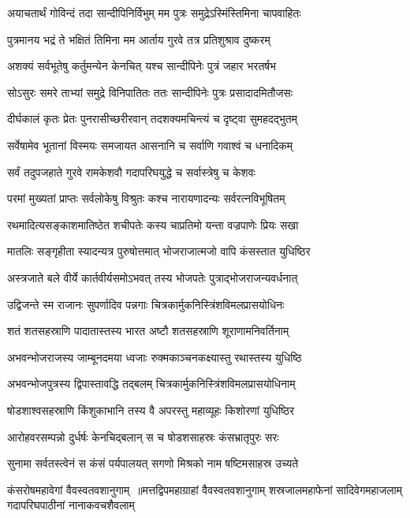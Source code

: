 \twolineshloka
{अयाचतार्थं गोविन्दं तदा सान्दीपिनिर्विभुम्}
{मम पुत्रः समुद्रेऽस्मिंस्तिमिना चापवाहितः}


\twolineshloka
{पुत्रमानय भद्रं ते भक्षितं तिमिना मम}
{आर्ताय गुरवे तत्र प्रतिशुश्राव दुष्करम्}


\twolineshloka
{अशक्यं सर्वभूतेषु कर्तुमन्येन केनचित्}
{यश्च सान्दीपिनेः पुत्रं जहार भरतर्षभ}


\twolineshloka
{सोऽसुरः समरे ताभ्यां समुद्रे विनिपातितः}
{ततः सान्दीपिनेः पुत्रः प्रसादादमितौजसः}


\twolineshloka
{दीर्घकालं कृतः प्रेतः पुनरासीच्छरीरवान्}
{तदशक्यमचिन्त्यं च दृष्ट्वा सुमहदद्भुतम्}


\twolineshloka
{सर्वेषामेव भूतानां विस्मयः समजायत}
{आसनानि च सर्वाणि गवाश्वं च धनादिकम्}


\twolineshloka
{सर्वं तदुपजहाते गुरवे रामकेशवौ}
{गदापरिघयुद्धे च सर्वास्त्रेषु च केशवः}


\twolineshloka
{परमां मुख्यतां प्राप्तः सर्वलोकेषु विश्रुतः}
{कश्च नारायणादन्यः सर्वरत्नविभूषितम्}


\twolineshloka
{रथमादित्यसङ्काशमातिष्ठेत शचीपतेः}
{कस्य चाप्रतिमो यन्ता वज्रपाणेः प्रियः सखा}


\twolineshloka
{मातलिः सङ्गृहीता स्यादन्यत्र पुरुषोत्तमात्}
{भोजराजात्मजो वापि कंसस्तात युधिष्ठिर}


\twolineshloka
{अस्त्रजाते बले वीर्ये कार्तवीर्यसमोऽभवत्}
{तस्य भोजपतेः पुत्राद्भोजराजन्यवर्धनात्}


\twolineshloka
{उद्विजन्ते स्म राजानः सुपर्णादिव पन्नगाः}
{चित्रकार्मुकनिस्त्रिंशविमलप्रासयोधिनः}


\twolineshloka
{शतं शतसहस्राणि पादातास्तस्य भारत}
{अष्टौ शतसहस्राणि शूराणामनिवर्तिनाम्}


\twolineshloka
{अभवन्भोजराजस्य जाम्बूनदमया ध्वजाः}
{रुक्मकाञ्चनकक्ष्यास्तु रथास्तस्य युधिष्ठि}


\twolineshloka
{अभवन्भोजपुत्रस्य द्विपास्तावद्धि तद्बलम्}
{चित्रकार्मुकनिस्त्रिंशविमलप्रासयोधिनाम्}


\twolineshloka
{षोडशाश्वसहस्राणि किंशुकाभानि तस्य वै}
{अपरस्तु महाव्यूहः किशोरणां युधिष्ठिर}


\twolineshloka
{आरोहवरसम्पन्नो दुर्धर्षः केनचिद्बलान्}
{स च षोडशसाहस्रः कंसभ्रातृपुरः सरः}


\twolineshloka
{सुनामा सर्वतस्त्वेनं स कंसं पर्यपालयत्}
{सगणो मिश्रको नाम षष्टिमसाहस्र उच्यते}


कंसरोषमहावेगां वैवस्वतवशानुगाम् ॥मत्तद्विपमहाग्राहां वैवस्वतवशानुगाम्
\twolineshloka
{शस्रजालमहाफेनां सादिवेगमहाजलाम्}
{गदापरिघपाठीनां नानाकवचशैवलाम्}


